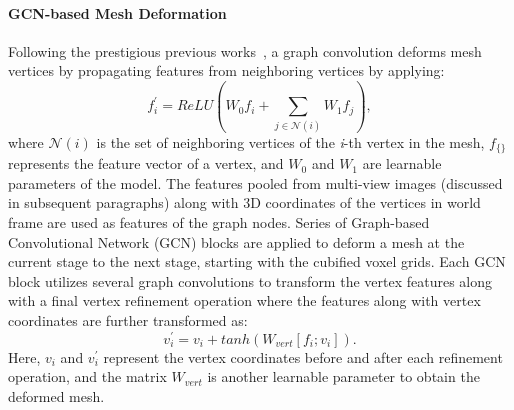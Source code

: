 



\paragraph{GCN-based Mesh Deformation}\vspace{-4mm}
Following the prestigious previous works~\cite{wang2018pixel2mesh,wen2019pixel2mesh++}, a graph convolution deforms mesh vertices by propagating features from neighboring vertices by applying:
\begin{equation}
f_{i}^{'} = ReLU(W_0f_i + \sum_{j \in \mathcal{N}(i)} W_1 f_j),
\end{equation}
where $\mathcal{N}(i)$ is the set of neighboring vertices of the \emph{i}-th vertex in the mesh, $f_{\{\}}$ represents the feature vector of a vertex, and $W_0$ and $W_1$ are learnable parameters of the model.
The features pooled from multi-view images (discussed in subsequent paragraphs) along with 3D coordinates of the vertices in world frame are used as features of the graph nodes.
Series of Graph-based Convolutional Network (GCN) blocks are applied to deform a mesh at the current stage to the next stage, starting with the cubified voxel grids.
Each GCN block utilizes several graph convolutions to transform the vertex features along with a final vertex refinement operation where the features along with vertex coordinates are further transformed as:
\begin{equation}
v_i^{'} = v_i + tanh(W_{vert}[f_i;v_i]).
\end{equation}
Here, $v_i$ and $v_i^{'}$ represent the vertex coordinates before and after each refinement operation, and the matrix $W_{vert}$ is another learnable parameter to obtain the deformed mesh.


